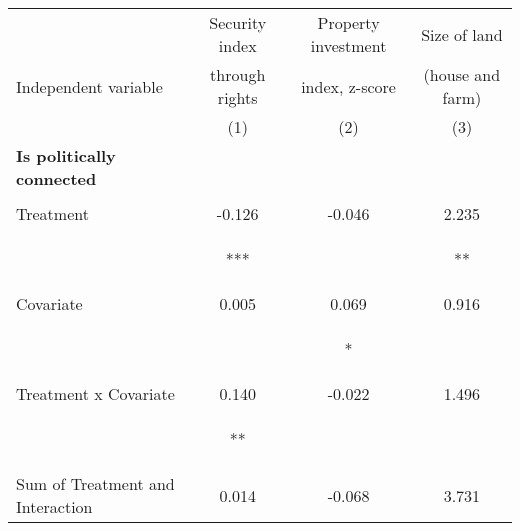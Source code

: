 \begin{tabular}{lccc}
\hline \noalign{\smallskip} & Security index & Property investment & Size of land\\
Independent variable & through rights & index, z-score & (house and farm)\\
 & (1) & (2) & (3)\\
\noalign{\smallskip}\hline \noalign{\smallskip}\textbf{Is politically connected} &  &  & \\
 & \begin{footnotesize}\end{footnotesize} & \begin{footnotesize}\end{footnotesize} & \begin{footnotesize}\end{footnotesize}\\
\noalign{\smallskip}Treatment & -0.126 & -0.046 & 2.235\\
 & \begin{footnotesize}[0.037]***\end{footnotesize} & \begin{footnotesize}[0.031]\end{footnotesize} & \begin{footnotesize}[1.137]**\end{footnotesize}\\
\noalign{\smallskip}Covariate & 0.005 & 0.069 & 0.916\\
 & \begin{footnotesize}[0.042]\end{footnotesize} & \begin{footnotesize}[0.038]*\end{footnotesize} & \begin{footnotesize}[1.370]\end{footnotesize}\\
\noalign{\smallskip}Treatment x Covariate & 0.140 & -0.022 & 1.496\\
 & \begin{footnotesize}[0.058]**\end{footnotesize} & \begin{footnotesize}[0.054]\end{footnotesize} & \begin{footnotesize}[1.956]\end{footnotesize}\\
\noalign{\smallskip}Sum of Treatment and Interaction & 0.014 & -0.068 & 3.731\\

\end{tabular}
